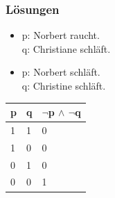 \begin{frame}
\frametitle{Lösungen}

\begin{table}

\begin{minipage}{0.48\textwidth}
\centering
\begin{itemize}
\item[] p: Norbert raucht.\\
q: Christiane schläft.
\end{itemize}
\end{minipage}
%
\begin{minipage}{0.48\textwidth}
\centering
\begin{itemize}
\item[] p: Norbert schläft.\\
q: Christine schläft.
\end{itemize}
\begin{tabular}{l|l|l}
p & q & $ \lnot $p $ \land $ $ \lnot $q\\
\hline
1 & 1 & 0\\
\hline
1 & 0 & 0\\
\hline
0 & 1 & 0\\
\hline
0 & 0 & 1\\
\end{tabular}
\end{minipage}

\end{table}
\end{frame}

